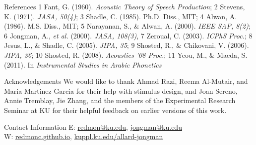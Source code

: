 \documentclass[final]{beamer}
\newlength{\onecolwid}
\begin{document}
\begin{frame}[t]
\begin{columns}[t]
\begin{column}{\onecolwid}
\begin{block}{\normalsize References}
\footnotesize
{\color{blue} 1} Fant, G. (1960). \emph{Acoustic Theory of Speech Production}; {\color{blue} 2} Stevens, K. (1971). \emph{JASA, 50(4)}; {\color{blue} 3} Shadle, C. (1985). Ph.D. Diss., MIT; {\color{blue} 4} Alwan, A. (1986). M.S. Diss., MIT; {\color{blue} 5} Narayanan, S., \& Alwan, A. (2000). \emph{IEEE SAP, 8(2)}; {\color{blue} 6} Jongman, A., \emph{et al.} (2000). \emph{JASA, 108(3)}, {\color{blue} 7} Zeroual, C. (2003). \emph{ICPhS Proc.}; {\color{blue} 8} Jesus, L., \& Shadle, C. (2005). \emph{JIPA, 35}; {\color{blue} 9} Shosted, R., \& Chikovani, V. (2006). \emph{JIPA, 36}; {\color{blue} 10} Shosted, R. (2008). \emph{Acoustics '08 Proc.}; {\color{blue} 11} Yeou, M., \& Maeda, S. (2011). In \emph{Instrumental Studies in Arabic Phonetics}
\end{block}

\begin{block}{\normalsize Acknowledgements}
\footnotesize
We would like to thank Ahmad Razi, Reema Al-Mutair, and Maria Martinez Garcia for their help with stimulus design, and Joan Sereno, Annie Tremblay, Jie Zhang, and the members of the Experimental Research Seminar at KU for their helpful feedback on earlier versions of this work.
\end{block}

\begin{block}{\normalsize Contact Information}
\small
E: \href{mailto:redmon@ku.edu}{redmon@ku.edu}, \href{mailto:jongman@ku.edu}{jongman@ku.edu}\\
W: \href{http://redmonc.github.io}{redmonc.github.io}, \href{https://kuppl.ku.edu/allard-jongman}{kuppl.ku.edu/allard-jongman}

\end{block}



\end{column} %

\end{columns} %

\end{frame} %
\end{document}

